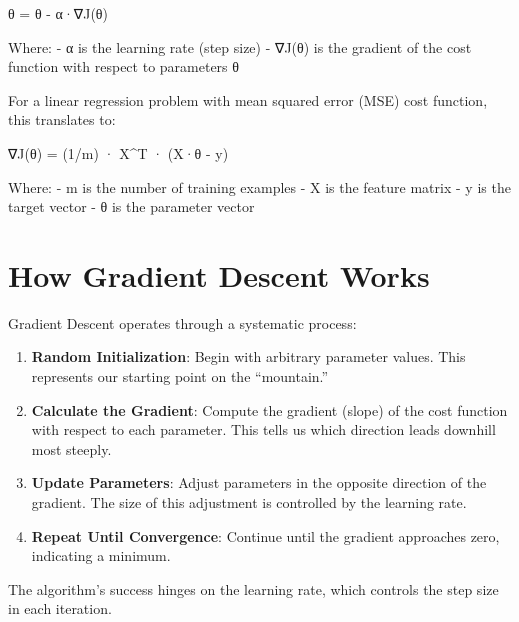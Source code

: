 \documentclass[
  letterpaper,
  DIV=11,
  numbers=noendperiod]{scrreprt}
\providecommand{\tightlist}{%
  \setlength{\itemsep}{0pt}\setlength{\parskip}{0pt}}\usepackage{longtable,booktabs,array}
\begin{document}
θ = θ - α·∇J(θ)

Where: - α is the learning rate (step size) - ∇J(θ) is the gradient of
the cost function with respect to parameters θ

For a linear regression problem with mean squared error (MSE) cost
function, this translates to:

∇J(θ) = (1/m) · X\^{}T · (X·θ - y)

Where: - m is the number of training examples - X is the feature matrix
- y is the target vector - θ is the parameter vector

\section{How Gradient Descent Works}\label{how-gradient-descent-works}

Gradient Descent operates through a systematic process:

\begin{enumerate}
\def\labelenumi{\arabic{enumi}.}
\tightlist
\item
  \textbf{Random Initialization}: Begin with arbitrary parameter values.
  This represents our starting point on the ``mountain.''
\item
  \textbf{Calculate the Gradient}: Compute the gradient (slope) of the
  cost function with respect to each parameter. This tells us which
  direction leads downhill most steeply.
\item
  \textbf{Update Parameters}: Adjust parameters in the opposite
  direction of the gradient. The size of this adjustment is controlled
  by the learning rate.
\item
  \textbf{Repeat Until Convergence}: Continue until the gradient
  approaches zero, indicating a minimum.
\end{enumerate}

The algorithm's success hinges on the learning rate, which controls the
step size in each iteration.
\end{document}
